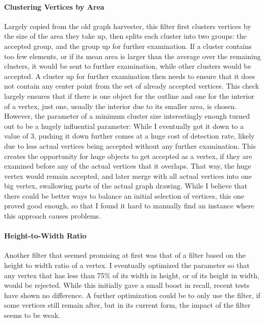 \documentclass[practical,english]{info1thesis}
\begin{document}
\paragraph{Clustering Vertices by Area}
Largely copied from the old graph harvester, this filter first clusters vertices by the size of the area they take up, then splits each cluster into two groups: the accepted group, and the group up for further examination.
If a cluster contains too few elements, or if its mean area is larger than the average over the remaining clusters, it would be sent to further examination, while other clusters would be accepted.
A cluster up for further examination then needs to ensure that it does not contain any center point from the set of already accepted vertices.
This check largely ensures that if there is one object for the outline and one for the interior of a vertex, just one, usually the interior due to its smaller area, is chosen.
However, the parameter of a minimum cluster size interestingly enough turned out to be a hugely influential parameter:
While I eventually got it down to a value of $3$, pushing it down further comes at a huge cost of detection rate, likely due to less actual vertices being accepted without any further examination.
This creates the opportunity for huge objects to get accepted as a vertex, if they are examined before any of the actual vertices that it overlaps.
That way, the huge vertex would remain accepted, and later merge with all actual vertices into one big vertex, swallowing parts of the actual graph drawing.
While I believe that there could be better ways to balance an initial selection of vertices, this one proved good enough, so that I found it hard to manually find an instance where this approach causes problems.


\paragraph{Height-to-Width Ratio}
Another filter that seemed promising at first was that of a filter based on the height to width ratio of a vertex.
I eventually optimized the parameter so that any vertex that has less than 75\% of its width in height, or of its height in width, would be rejected.
While this initially gave a small boost in recall, recent tests have shown no difference.
A further optimization could be to only use the filter, if some vertices still remain after, but in its current form, the impact of the filter seems to be weak.
\end{document}
